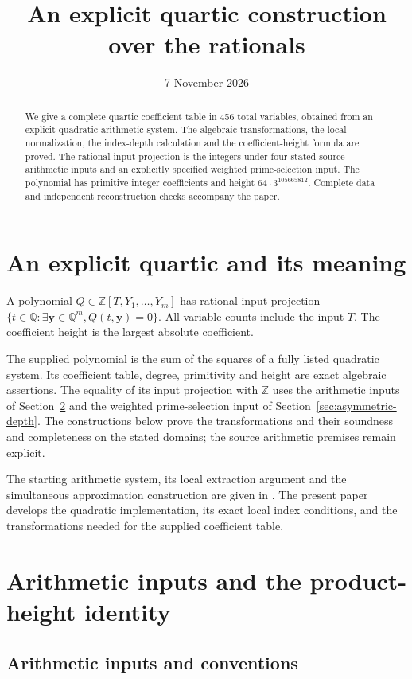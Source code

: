 \documentclass[11pt,a4paper]{article}
\title{An explicit quartic construction over the rationals}
\author{}
\date{7 November 2026}
\theoremstyle{definition}
\theoremstyle{remark}
\begin{document}
\maketitle
\begin{abstract}
We give a complete quartic coefficient table in 456 total
variables, obtained from an explicit quadratic arithmetic system.
The algebraic transformations, the local normalization, the index-depth
calculation and the coefficient-height formula are proved. The rational
input projection is the integers under four stated source arithmetic
inputs and an explicitly specified weighted prime-selection input.
The polynomial has primitive integer coefficients and height
$64\cdot3^{105665812}$. Complete data and independent reconstruction
checks accompany the paper.
\end{abstract}
\tableofcontents
\newpage
\section{An explicit quartic and its meaning}
A polynomial $Q\in\mathbb Z[T,Y_1,\ldots,Y_m]$ has rational
input projection $\{t\in\mathbb Q:\exists\mathbf y\in\mathbb Q^m,
Q(t,\mathbf y)=0\}$. All variable counts include the input $T$.
The coefficient height is the largest absolute coefficient.

The supplied polynomial is the sum of the squares of a fully listed
quadratic system. Its coefficient table, degree, primitivity and
height are exact algebraic assertions. The equality of its input
projection with $\mathbb Z$ uses the arithmetic inputs of
Section~\ref{sec:u29} and the weighted prime-selection input of
Section~\ref{sec:asymmetric-depth}. The constructions below prove
the transformations and their soundness and completeness on the
stated domains; the source arithmetic premises remain explicit.

The starting arithmetic system, its local extraction argument and
the simultaneous approximation construction are given in
\cite{SmallVariables2026,RepositoryV9}. The present paper develops
the quadratic implementation, its exact local index conditions,
and the transformations needed for the supplied coefficient table.
\section{Arithmetic inputs and the product-height identity}\label{sec:u29}
\subsection{Arithmetic inputs and conventions}
\end{document}
